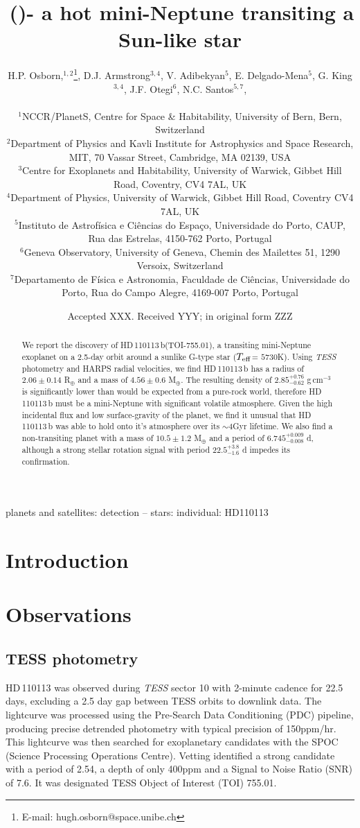 \documentclass[fleqn,usenatbib]{mnras}
\title[\Tplanet]{\Tplanet\,(\TTplanet)- a hot mini-Neptune transiting a Sun-like star}
\author[H.P. Osborn et al.]{
\parbox{\textwidth}{H.P. Osborn,$^{{1},{2}}$\thanks{E-mail: hugh.osborn@space.unibe.ch},
D.J. Armstrong$^{3,4}$, %
V. Adibekyan$^{5}$, %
E. Delgado-Mena$^{5}$,
G. King$^{3,4}$, %
J.F. Otegi$^{6}$, %
N.C. Santos$^{5,7}$, %
}\\
$^{1}$NCCR/PlanetS, Centre for Space \& Habitability, University of Bern, Bern, Switzerland\\
$^{2}$Department of Physics and Kavli Institute for Astrophysics and Space Research, MIT, 70 Vassar Street, Cambridge, MA 02139, USA\\
$^{3}$Centre for Exoplanets and Habitability, University of Warwick, Gibbet Hill Road, Coventry, CV4 7AL, UK\\
$^{4}$Department of Physics, University of Warwick, Gibbet Hill Road, Coventry CV4 7AL, UK \\
$^{5}$Instituto de Astrof\'isica e Ci\^encias do Espa\c{c}o, Universidade do Porto, CAUP, Rua das Estrelas, 4150-762 Porto, Portugal\\
$^{6}$Geneva Observatory, University of Geneva, Chemin des Mailettes 51, 1290 Versoix, Switzerland\\
$^{7}$Departamento de F\'isica e Astronomia, Faculdade de Ci\^{e}ncias, Universidade do Porto, Rua do Campo Alegre, 4169-007 Porto, Portugal\\
}
\date{Accepted XXX. Received YYY; in original form ZZZ}
\newcommand{\gcm}{g\,cm$^{-3}$}	%
\newcommand{\tess}{{\it TESS}}
\newcommand{\harps}{{HARPS}}
\newcommand{\rearth}{R$_{\oplus}$}
\newcommand{\mearth}{M$_{\oplus}$}
\newcommand{\teff}{$T_{\rm eff}$}
\newcommand{\TPone}{ $ 6.745^{+0.009}_{-0.008} $ }
\newcommand{\TMpzero}{ $ 4.56 \pm 0.6 $ }
\newcommand{\TMpone}{ $ 10.5 \pm 1.2 $ }
\newcommand{\Trplzero}{ $ 2.06 \pm 0.14 $ }
\newcommand{\Trhopgcmthreezero}{ $ 2.85^{+0.76}_{-0.62} $ }
\newcommand{\Tperiod}{ $ 22.5^{+3.8}_{-1.6} $ }
\newcommand{\TTplanet}{TOI-755.01}
\newcommand{\Tstar}{HD\,110113}
\newcommand{\Tplanet}{HD\,110113\,b}
\begin{document}
\label{firstpage}
\pagerange{\pageref{firstpage}--\pageref{lastpage}}
\maketitle

\begin{abstract}
We report the discovery of \Tplanet{}(\TTplanet{}), a transiting mini-Neptune exoplanet on a 2.5-day orbit around a sunlike G-type star (\teff{}= $5730$K).
Using \tess{} photometry and \harps{} radial velocities, we find \Tplanet{} has a radius of \Trplzero{}\rearth{} and a mass of \TMpzero{} \mearth{}.
The resulting density of \Trhopgcmthreezero{}\gcm{} is significantly lower than would be expected from a pure-rock world, therefore \Tplanet{} must be a mini-Neptune with significant volatile atmosphere.
Given the high incidental flux and low surface-gravity of the planet, we find it unusual that \Tplanet{} was able to hold onto it's atmosphere over its $\sim4$Gyr lifetime.
We also find a non-transiting planet with a mass of \TMpone{} \mearth{} and a period of \TPone{}d, although a strong stellar rotation signal with period \Tperiod{}d impedes its confirmation.
\end{abstract}

\begin{keywords}
planets and satellites: detection -- stars: individual: HD110113
\end{keywords}



\section{Introduction}


\section{Observations}

\subsection{TESS photometry}
\Tstar{} was observed during \tess{} sector 10 with 2-minute cadence for 22.5 days, excluding a 2.5 day gap between TESS orbits to downlink data.
The lightcurve was processed using the Pre-Search Data Conditioning (PDC) pipeline, producing precise detrended photometry with typical precision of 150ppm/hr.
This lightcurve was then searched for exoplanetary candidates with the SPOC (Science Processing Operations Centre).
Vetting identified a strong candidate with a period of 2.54, a depth of only 400ppm and a Signal to Noise Ratio (SNR) of 7.6.
It was designated TESS Object of Interest (TOI) 755.01. 
\end{document}

